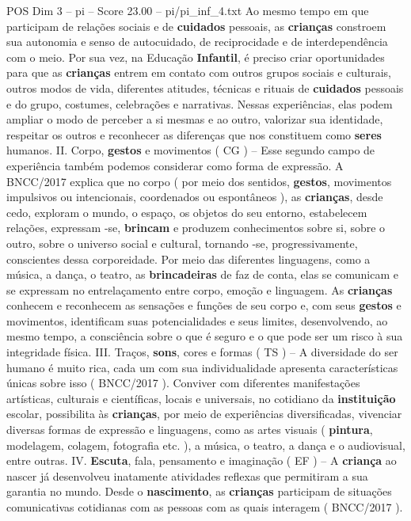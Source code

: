 \begin{textsample}{POS Dim 3 – pi – Score 23.00 – pi/pi\_inf\_4.txt}
Ao mesmo tempo em que participam de relações sociais e de \textbf{cuidados} pessoais, as \textbf{crianças} constroem sua autonomia e senso de autocuidado, de reciprocidade e de interdependência com o meio.
Por sua vez, na Educação \textbf{Infantil}, é preciso criar oportunidades para que as \textbf{crianças} entrem em contato com outros grupos sociais e culturais, outros modos de vida, diferentes atitudes, técnicas e rituais de \textbf{cuidados} pessoais e do grupo, costumes, celebrações e narrativas.
Nessas experiências, elas podem ampliar o modo de perceber a si mesmas e ao outro, valorizar sua identidade, respeitar os outros e reconhecer as diferenças que nos constituem como \textbf{seres} humanos.
II.
Corpo, \textbf{gestos} e movimentos ( CG ) – Esse segundo campo de experiência também podemos considerar como forma de expressão.
A BNCC/2017 explica que no corpo ( por meio dos sentidos, \textbf{gestos}, movimentos impulsivos ou intencionais, coordenados ou espontâneos ), as \textbf{crianças}, desde cedo, exploram o mundo, o espaço, os objetos do seu entorno, estabelecem relações, expressam -se, \textbf{brincam} e produzem conhecimentos sobre si, sobre o outro, sobre o universo social e cultural, tornando -se, progressivamente, conscientes dessa corporeidade.
Por meio das diferentes linguagens, como a música, a dança, o teatro, as \textbf{brincadeiras} de faz de conta, elas se comunicam e se expressam no entrelaçamento entre corpo, emoção e linguagem.
As \textbf{crianças} conhecem e reconhecem as sensações e funções de seu corpo e, com seus \textbf{gestos} e movimentos, identificam suas potencialidades e seus limites, desenvolvendo, ao mesmo tempo, a consciência sobre o que é seguro e o que pode ser um risco à sua integridade física.
III.
Traços, \textbf{sons}, cores e formas ( TS ) – A diversidade do ser humano é muito rica, cada um com sua individualidade apresenta características únicas sobre isso ( BNCC/2017 ).
Conviver com diferentes manifestações artísticas, culturais e científicas, locais e universais, no cotidiano da \textbf{instituição} escolar, possibilita às \textbf{crianças}, por meio de experiências diversificadas, vivenciar diversas formas de expressão e linguagens, como as artes visuais ( \textbf{pintura}, modelagem, colagem, fotografia etc. ), a música, o teatro, a dança e o audiovisual, entre outras.
IV. \textbf{Escuta}, fala, pensamento e imaginação ( EF ) – A \textbf{criança} ao nascer já desenvolveu inatamente atividades reflexas que permitiram a sua garantia no mundo.
Desde o \textbf{nascimento}, as \textbf{crianças} participam de situações comunicativas cotidianas com as pessoas com as quais interagem ( BNCC/2017 ).

\end{textsample}
